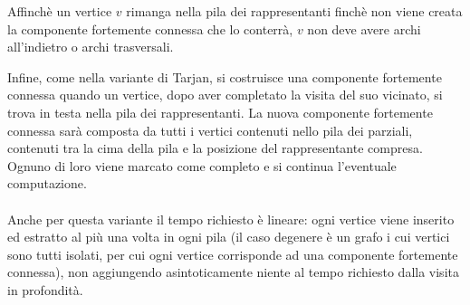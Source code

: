 Affinch\`e un vertice $v$ rimanga nella pila dei rappresentanti
finch\`e non viene creata la componente fortemente connessa che lo
conterr\`a, $v$ non deve avere archi all'indietro o archi trasversali.

Infine, come nella variante di Tarjan, si costruisce una componente
fortemente connessa quando un vertice, dopo aver completato la visita
del suo vicinato, si trova in testa nella pila dei rappresentanti. La
nuova componente fortemente connessa sar\`a composta da tutti i
vertici contenuti nello pila dei parziali, contenuti tra la cima della
pila e la posizione del rappresentante compresa. Ognuno di loro viene
marcato come completo e si continua l'eventuale computazione.
\\\\
Anche per questa variante il tempo richiesto \`e lineare: ogni vertice
viene inserito ed estratto al pi\`u una volta in ogni pila (il caso
degenere \`e un grafo i cui vertici sono tutti isolati, per cui ogni
vertice corrisponde ad una componente fortemente connessa), non
aggiungendo asintoticamente niente al tempo richiesto dalla visita in
profondit\`a.




